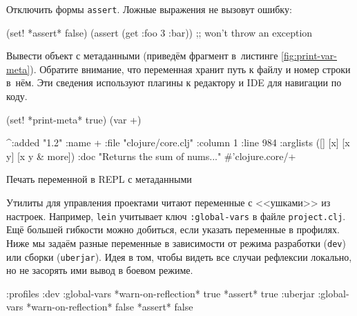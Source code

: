 \fi

Отключить формы \verb|assert|. Ложные выражения не вызовут ошибку:

\begin{english}
  \begin{clojure}
(set! *assert* false)
(assert (get {:foo 3} :bar))
;; won't throw an exception
  \end{clojure}
\end{english}

Вывести объект с метаданными (приведём фрагмент в~листинге
\ref{fig:print-var-meta}). Обратите внимание, что переменная хранит путь к файлу
и номер строки в~нём. Эти сведения используют плагины к редактору и IDE для
навигации по коду.

\begin{listing}[ht!]

\begin{english}
  \begin{clojure}
(set! *print-meta* true)
(var +)

^{:added "1.2"
  :name +
  :file "clojure/core.clj"
  :column 1
  :line 984
  :arglists ([] [x] [x y] [x y & more])
  :doc "Returns the sum of nums..."}
#'clojure.core/+
  \end{clojure}
\end{english}

\caption{Печать переменной в REPL с метаданными}
\label{fig:print-var-meta}

\end{listing}


Утилиты для управления проектами читают переменные с <<ушками>> из
настроек. Например, \verb|lein| учитывает ключ \texttt{:glo\-bal\--vars} в файле
\verb|project.clj|. Ещё большей гибкости можно добиться, если указать переменные
в профилях. Ниже мы задаём разные переменные в зависимости от режима разработки
(\verb|dev|) или сборки (\verb|uberjar|). Идея в том, чтобы видеть все случаи
рефлексии локально, но не засорять ими вывод в боевом режиме.

\ifnarrow

\begin{english}
  \begin{clojure}
{:profiles
 :dev {:global-vars
       {*warn-on-reflection* true
        *assert* true}}
 :uberjar {:global-vars
           {*warn-on-reflection* false
            *assert* false}}}
  \end{clojure}
\end{english}

